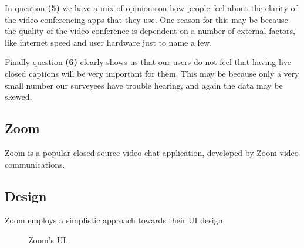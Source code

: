 In question \textbf{(5)} we have a mix of opinions on how
people feel about the clarity of the video conferencing apps
that they use. One reason for this may be because the quality
of the video conference is dependent on a number of external 
factors, like internet speed and user hardware just to name 
a few. \\ \vspace{0.2cm}

Finally question \textbf{(6)} clearly shows us that our users
do not feel that having live closed captions will be very 
important for them. This may be because only a very small 
number our surveyees have trouble hearing, and again the 
data may be skewed.

\normalsize

\onecolumn

\subsection{Zoom}

Zoom is a popular closed-source video chat application,
developed by Zoom video communications. 

\subsection*{Design}

Zoom employs a simplistic approach towards their UI 
design. 

\begin{figure}[H]

\centering
    \qquad
\centering

\caption{Zoom's UI.}
\label{fig:Zoom}
\end{figure}

